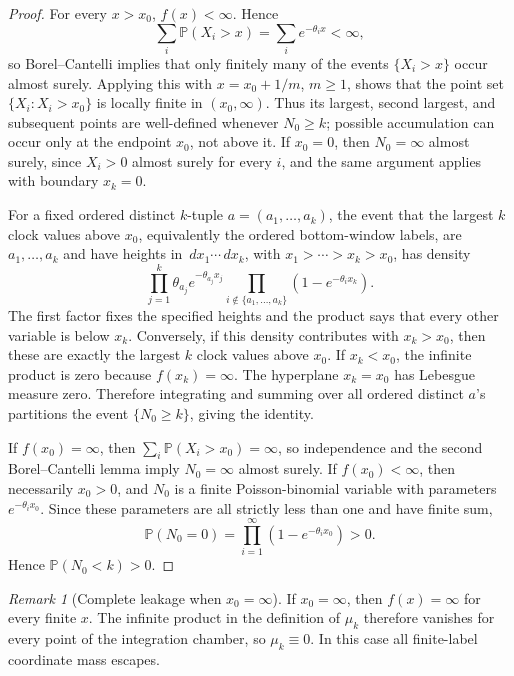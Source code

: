 \documentclass[11pt]{article}
\theoremstyle{remark}
\newtheorem{remark}[theorem]{Remark}
\newcommand{\Pp}{\mathbb P}
\newcommand{\dd}{\,d}
\begin{document}
\begin{proof}
For every \(x>x_0\), \(f(x)<\infty\).  Hence
\[
        \sum_i \Pp(X_i>x)=\sum_i e^{-\theta_i x}<\infty,
\]
so Borel--Cantelli implies that only finitely many of the events
\(\{X_i>x\}\) occur almost surely.  Applying this with
\(x=x_0+1/m\), \(m\ge1\), shows that the point set
\(\{X_i:X_i>x_0\}\) is locally finite in \((x_0,\infty)\).  Thus its
largest, second largest, and subsequent points are well-defined whenever
\(N_0\ge k\); possible accumulation can occur only at the endpoint \(x_0\),
not above it.  If \(x_0=0\), then \(N_0=\infty\) almost surely, since
\(X_i>0\) almost surely for every \(i\), and the same argument applies with
boundary \(x_k=0\).

For a fixed ordered distinct \(k\)-tuple \(a=(a_1,\ldots,a_k)\), the event that
the largest \(k\) clock values above \(x_0\), equivalently the ordered
bottom-window labels, are \(a_1,\ldots,a_k\) and have heights in
\(\dd x_1\cdots\dd x_k\), with \(x_1>\cdots>x_k>x_0\), has density
\[
     \prod_{j=1}^k \theta_{a_j}e^{-\theta_{a_j}x_j}
     \prod_{i\notin\{a_1,\ldots,a_k\}}(1-e^{-\theta_i x_k}).
\]
The first factor fixes the specified heights and the product says that every other variable is below \(x_k\).  Conversely, if this density contributes with \(x_k>x_0\), then these are exactly the largest \(k\) clock values above \(x_0\).  If \(x_k<x_0\), the infinite product is zero because \(f(x_k)=\infty\).  The hyperplane \(x_k=x_0\) has Lebesgue measure zero.  Therefore integrating and summing over all ordered distinct \(a\)'s partitions the event \(\{N_0\ge k\}\), giving the identity.

If \(f(x_0)=\infty\), then \(\sum_i\Pp(X_i>x_0)=\infty\), so
independence and the second Borel--Cantelli lemma imply \(N_0=\infty\) almost
surely.  If \(f(x_0)<\infty\), then necessarily $x_0>0$, and $N_0$ is a
finite Poisson-binomial variable with parameters $e^{-\theta_i x_0}$.  Since
these parameters are all strictly less than one and have finite sum,
\[
        \Pp(N_0=0)=\prod_{i=1}^\infty
        (1-e^{-\theta_i x_0})>0.
\]
Hence $\Pp(N_0<k)>0$.
\end{proof}

\begin{remark}[Complete leakage when $x_0=\infty$]
If $x_0=\infty$, then $f(x)=\infty$ for every finite $x$.  The infinite
product in the definition of $\mu_k$ therefore vanishes for every point of the
integration chamber, so $\mu_k\equiv0$.  In this case all finite-label
coordinate mass escapes.
\end{remark}
\end{document}
